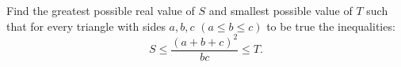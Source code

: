 Find the greatest possible real value of $S$ and smallest possible value of $T$ such that for every triangle with sides $a,b,c$ $(a\le b\le c)$ to be true the inequalities:
$$S\le\frac{(a+b+c)^2}{bc}\le T.$$